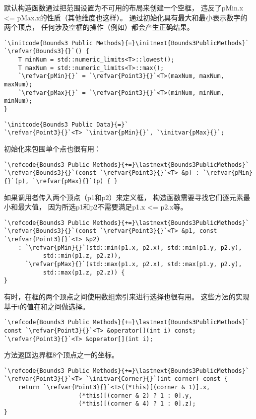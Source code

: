 默认构造函数通过把范围设置为不可用的布局来创建一个空框，
违反了{\ttfamily pMin.x <= pMax.x}的性质（其他维度也这样）。
通过初始化具有最大和最小表示数字的两个顶点，
任何涉及空框的操作（例如）都会产生正确结果。
\begin{lstlisting}
`\initcode{Bounds3 Public Methods}{=}\initnext{Bounds3PublicMethods}`
`\refvar{Bounds3}{}`() {
    T minNum = std::numeric_limits<T>::lowest();
    T maxNum = std::numeric_limits<T>::max();
    `\refvar{pMin}{}` = `\refvar{Point3}{}`<T>(maxNum, maxNum, maxNum);
    `\refvar{pMax}{}` = `\refvar{Point3}{}`<T>(minNum, minNum, minNum);
}
\end{lstlisting}

\begin{lstlisting}
`\initcode{Bounds3 Public Data}{=}`
`\refvar{Point3}{}`<T> `\initvar{pMin}{}`, `\initvar{pMax}{}`;
\end{lstlisting}

初始化来包围单个点也很有用：
\begin{lstlisting}
`\refcode{Bounds3 Public Methods}{+=}\lastnext{Bounds3PublicMethods}`
`\refvar{Bounds3}{}`(const `\refvar{Point3}{}`<T> &p) : `\refvar{pMin}{}`(p), `\refvar{pMax}{}`(p) { }
\end{lstlisting}

如果调用者传入两个顶点（{\ttfamily p1}和{\ttfamily p2}）来定义框，
构造函数需要寻找它们逐元素最小和最大值，
因为所选{\ttfamily p1}和{\ttfamily p2}不需要满足{\ttfamily p1.x <= p2.x}等。
\begin{lstlisting}
`\refcode{Bounds3 Public Methods}{+=}\lastnext{Bounds3PublicMethods}`
`\refvar{Bounds3}{}`(const `\refvar{Point3}{}`<T> &p1, const `\refvar{Point3}{}`<T> &p2)
    : `\refvar{pMin}{}`(std::min(p1.x, p2.x), std::min(p1.y, p2.y),
           std::min(p1.z, p2.z)),
      `\refvar{pMax}{}`(std::max(p1.x, p2.x), std::max(p1.y, p2.y),
           std::max(p1.z, p2.z)) {
}
\end{lstlisting}

有时，在框的两个顶点之间使用数组索引来进行选择也很有用。
这些方法的实现基于{\ttfamily i}的值在和之间做选择。
\begin{lstlisting}
`\refcode{Bounds3 Public Methods}{+=}\lastnext{Bounds3PublicMethods}`
const `\refvar{Point3}{}`<T> &operator[](int i) const;
`\refvar{Point3}{}`<T> &operator[](int i);
\end{lstlisting}

方法返回边界框8个顶点之一的坐标。
\begin{lstlisting}
`\refcode{Bounds3 Public Methods}{+=}\lastnext{Bounds3PublicMethods}`
`\refvar{Point3}{}`<T> `\initvar{Corner}{}`(int corner) const {
    return `\refvar{Point3}{}`<T>((*this)[(corner & 1)].x,
                     (*this)[(corner & 2) ? 1 : 0].y,
                     (*this)[(corner & 4) ? 1 : 0].z);
}
\end{lstlisting}

